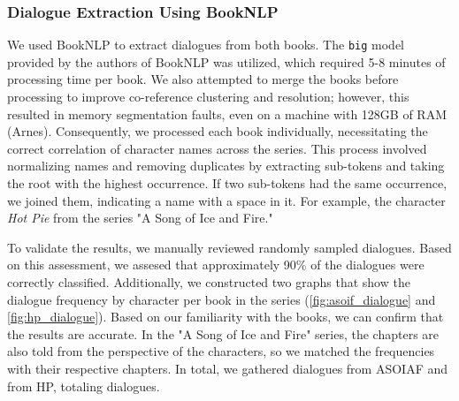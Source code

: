 \documentclass[fleqn,moreauthors,10pt]{ds_report}
\begin{document}
\subsubsection*{Dialogue Extraction Using BookNLP}

We used BookNLP to extract dialogues from both books. The \texttt{big} model provided by the authors of BookNLP was utilized, which required 5-8 minutes of processing time per book. We also attempted to merge the books before processing to improve co-reference clustering and resolution; however, this resulted in memory segmentation faults, even on a machine with 128GB of RAM (Arnes). Consequently, we processed each book individually, necessitating the correct correlation of character names across the series. This process involved normalizing names and removing duplicates by extracting sub-tokens and taking the root with the highest occurrence. If two sub-tokens had the same occurrence, we joined them, indicating a name with a space in it. For example, the character \textit{Hot Pie} from the series "A Song of Ice and Fire."

To validate the results, we manually reviewed randomly sampled dialogues. Based on this assessment, we assesed that approximately 90\% of the dialogues were correctly classified. Additionally, we constructed two graphs that show the dialogue frequency by character per book in the series (\cref{fig:asoif_dialogue} and \cref{fig:hp_dialogue}). Based on our familiarity with the books, we can confirm that the results are accurate. In the "A Song of Ice and Fire" series, the chapters are also told from the perspective of the characters, so we matched the frequencies with their respective chapters. In total, we gathered  dialogues from ASOIAF and  from HP, totaling  dialogues.
\end{document}
